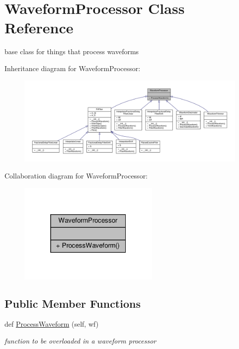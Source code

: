 \hypertarget{classSignalIntegrity_1_1TimeDomain_1_1Filters_1_1WaveformProcessor_1_1WaveformProcessor}{}\section{Waveform\+Processor Class Reference}
\label{classSignalIntegrity_1_1TimeDomain_1_1Filters_1_1WaveformProcessor_1_1WaveformProcessor}


base class for things that process waveforms  




Inheritance diagram for Waveform\+Processor\+:
\nopagebreak
\begin{figure}[H]
\begin{center}
\leavevmode
\includegraphics[width=350pt]{classSignalIntegrity_1_1TimeDomain_1_1Filters_1_1WaveformProcessor_1_1WaveformProcessor__inherit__graph}
\end{center}
\end{figure}


Collaboration diagram for Waveform\+Processor\+:
\nopagebreak
\begin{figure}[H]
\begin{center}
\leavevmode
\includegraphics[width=193pt]{classSignalIntegrity_1_1TimeDomain_1_1Filters_1_1WaveformProcessor_1_1WaveformProcessor__coll__graph}
\end{center}
\end{figure}
\subsection*{Public Member Functions}
\begin{DoxyCompactItemize}
\item 
def \hyperlink{classSignalIntegrity_1_1TimeDomain_1_1Filters_1_1WaveformProcessor_1_1WaveformProcessor_ae09bec195c9cb1d5819e73b7be169b11}{Process\+Waveform} (self, wf)
\begin{DoxyCompactList}\small\item\em function to be overloaded in a waveform processor \end{DoxyCompactList}\end{DoxyCompactItemize}


